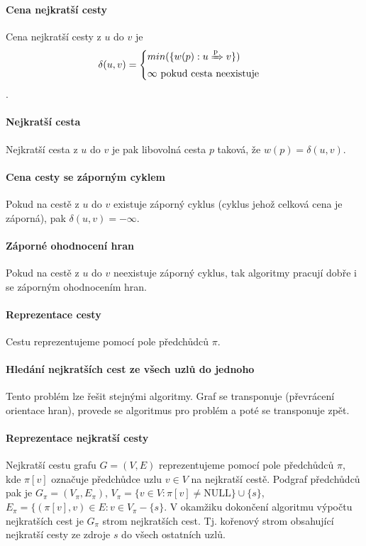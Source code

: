 \paragraph*{Cena nejkratší cesty} Cena nejkratší cesty z $u$ do $v$ je $$
\delta(u, v) = \begin{cases}
    min( \{ w(p) : u \xRightarrow{\text{p}} v \} ) \\
    \infty ~ \text{pokud cesta neexistuje}
\end{cases}
$$.

\paragraph*{Nejkratší cesta} Nejkratší cesta z $u$ do $v$ je pak libovolná cesta $p$ taková, že $w(p) = \delta(u, v)$.

\paragraph*{Cena cesty se záporným cyklem} Pokud na cestě z $u$ do $v$ existuje záporný cyklus (cyklus jehož celková cena je záporná), pak $\delta(u, v) = - \infty$.

\paragraph*{Záporné ohodnocení hran} Pokud na cestě z $u$ do $v$ neexistuje záporný cyklus, tak algoritmy pracují dobře i se záporným ohodnocením hran.

\paragraph*{Reprezentace cesty} Cestu reprezentujeme pomocí pole předchůdců $\pi$.

\paragraph*{Hledání nejkratších cest ze všech uzlů do jednoho} Tento problém lze řešit stejnými algoritmy. Graf se transponuje (převrácení orientace hran), provede se algoritmus pro problém  a poté se transponuje zpět.

\paragraph*{Reprezentace nejkratší cesty} Nejkratší cestu grafu $G = (V, E)$ reprezentujeme pomocí pole předchůdců $\pi$, kde $\pi[v]$ označuje předchůdce uzlu $v \in V$ na nejkratší cestě. Podgraf předchůdců pak je $G_{\pi} = (V_{\pi}, E_{\pi})$, $V_{\pi} = \{ v \in V : \pi[v] \neq \text{NULL} \} \cup \{ s \}$, $E_{\pi} = \{ (\pi[v], v) \in E : v \in V_{\pi} - \{ s \}$. V okamžiku dokončení algoritmu výpočtu nejkratších cest je $G_{\pi}$ strom nejkratších cest. Tj. kořenový strom obsahující nejkratší cesty ze zdroje $s$ do všech ostatních uzlů.

